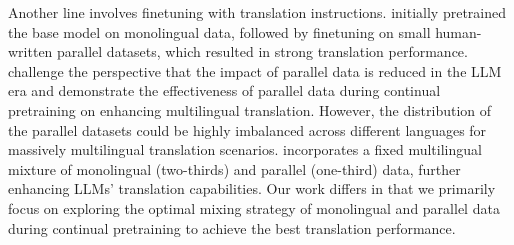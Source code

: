 Another line involves finetuning with translation instructions. \citet{DBLP:conf/iclr/Xu0SA24} initially pretrained the base model on monolingual data, followed by finetuning on small human-written parallel datasets, which resulted in strong translation performance. \citet{guo-etal-2024-novel} challenge the perspective that the impact of parallel data is reduced in the LLM era and demonstrate the effectiveness of parallel data during continual pretraining on enhancing multilingual translation. However, the distribution of the parallel datasets could be highly imbalanced across different languages for massively multilingual translation scenarios. \citet{alves2024tower} incorporates a fixed multilingual mixture of monolingual (two-thirds) and parallel (one-third) data, further enhancing LLMs' translation capabilities. Our work differs in that we primarily focus on exploring the optimal mixing strategy of monolingual and parallel data during continual pretraining to achieve the best translation performance.